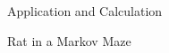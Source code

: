 \documentclass[12pt]{article}
\newcommand{\matindex}[1]{\mbox{\scriptsize#1}}
\newcommand\scalemath[2]{\scalebox{#1}{\mbox{\ensuremath{\displaystyle #2}}}}
\numberwithin{equation}{section}
\begin{document}
\begin{section}{Application and Calculation}
\begin{subsection}{Rat in a Markov Maze}
\begin{enumerate}
%

\end{enumerate}
\end{subsection}
\end{section}
\end{document}
